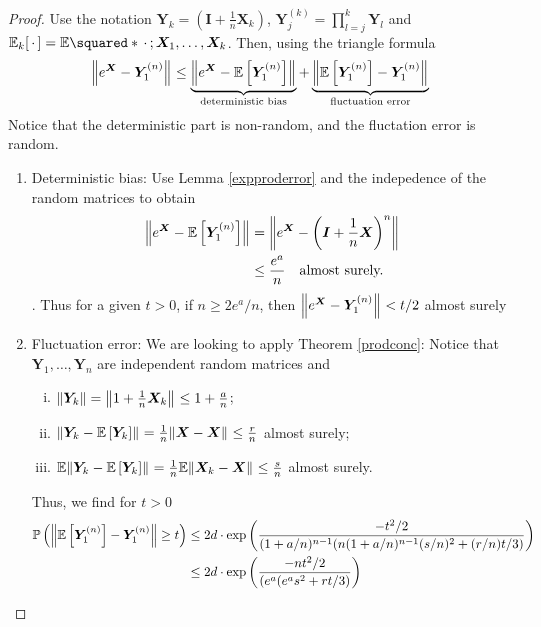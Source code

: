 \begin{proof}
    Use the notation \( \bm{Y}_k = \left(\bm{I}+ \frac{1}{n}\bm{X}_k\right) \), \( \bm{Y}_j^{(k)} = \prod_{l=j}^{k} \bm{Y}_l\) and \( \mathbb{E}_k[\,\cdot\,] = \mathbb{E}\squared*{\,\cdot\,;\bm{X}_1,\dots,\bm{X}_k} \). Then, using the triangle formula
    \begin{equation} \norm{e^{\bm{X}}- \bm{Y}_1^{(n)}}_{} \leq \underbrace{\norm{e^{\bm{X}}- \mathbb{E}\left[\bm{Y}_1^{(n)}\right]}_{}}_{\text{deterministic bias}} + \underbrace{\norm{\mathbb{E}\left[\bm{Y}_1^{(n)}\right]- \bm{Y}_1^{(n)}}_{}}_{\text{fluctuation error}}  \label{eq:decomp1}\end{equation}
    Notice that the deterministic part is non-random, and the fluctation error is random.
    \begin{enumerate}[1)]
      \item Deterministic bias: Use Lemma \ref{expproderror} and the indepedence of the random matrices to obtain
        \begin{align*} \norm{e^{\bm{X}}- \mathbb{E}\left[\bm{Y}_1^{(n)}\right]}_{} &=  \norm{e^{\bm{X}}- \left(\bm{I}+ \frac{1}{n}\bm{X}\right)^{n}}  \\
        &\leq  \frac{e^{a}}{n} \quad \text{almost surely.}\end{align*}. Thus for a given \( t >0 \), if \( n \geq 2e^{a}/n \), then \( \norm{e^{\bm{X}}-\bm{Y}_1^{(n)}}_{} <t/2 \) almost surely 
      \item Fluctuation error: We are looking to apply Theorem \ref{prodconc}: Notice that \( \bm{Y}_1, \dots, \bm{Y}_n \) are independent random matrices and 
        \begin{enumerate}[i)]
        \item \(\norm{\bm{Y}_k} = \norm{1+\frac{1}{n}\bm{X}_k}_{} \leq 1+ \frac{a}{n} \);
        \item \( \norm{\bm{Y}_k- \mathbb{E}\left[\bm{Y}_k\right]}_{} = \frac{1}{n} \norm{\bm{X}-\bm{X}}_{} \leq \frac{r}{n}\) almost surely;
        \item \( \mathbb{E} \norm{\bm{Y}_k- \mathbb{E}\left[\bm{Y}_k\right]}_{} = \frac{1}{n} \mathbb{E} \norm{\bm{X}_k-\bm{X}}_{} \leq \frac{s}{n} \) almost surely.
        \end{enumerate}
        Thus, we find for \( t> 0 \)
          \begin{align*} 
          \mathbb{P}\left( \norm{\mathbb{E}\left[\bm{Y}_1^{(n)}\right]- \bm{Y}_1^{(n)}} \geq t\right) &\leq  2d \cdot \operatorname{exp}\left(\frac{-t^2/2}{(1+a/n)^{n-1}(n(1+a/n)^{n-1}(s/n)^2+(r/n)t/3)}\right)\\
            &\leq 2d \cdot \operatorname{exp}\left(\frac{-nt^2/2}{(e^{a}(e^a s^2+rt/3)}\right) 
          \end{align*}
            

\end{enumerate}
\end{proof}
